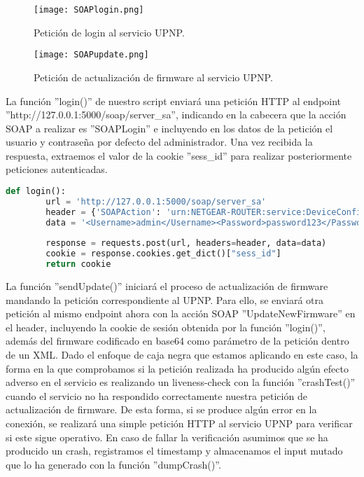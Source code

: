 \begin{figure}[H]
    \centering
    \texttt{[image: SOAPlogin.png]}
    \caption{Petición de login al servicio UPNP.}
    \label{fig:SOAPlogin}
\end{figure}

\begin{figure}[H]
    \centering
    \texttt{[image: SOAPupdate.png]}
    \caption{Petición de actualización de firmware al servicio UPNP.}
    \label{fig:SOAPupdate}
\end{figure}

La función ''login()'' de nuestro script enviará una petición HTTP al endpoint 
''http://127.0.0.1:5000/soap/server\_sa'', indicando en la cabecera que la acción SOAP a realizar es ''SOAPLogin''
e incluyendo en los datos de la petición el usuario y contraseña por defecto del administrador. Una vez 
recibida la respuesta, extraemos el valor de la cookie ''sess\_id'' para realizar posteriormente peticiones
autenticadas.

\begin{lstlisting}[language=python, caption=Función para realizar login en el servicio UPNP., captionpos=b,
    frame=single, breaklines, showstringspaces=false]
    def login():
        url = 'http://127.0.0.1:5000/soap/server_sa'
        header = {'SOAPAction': 'urn:NETGEAR-ROUTER:service:DeviceConfig:1#SOAPLogin'}
        data = '<Username>admin</Username><Password>password123</Password>'
        
        response = requests.post(url, headers=header, data=data)
        cookie = response.cookies.get_dict()["sess_id"]
        return cookie
\end{lstlisting}

La función ''sendUpdate()'' iniciará el proceso de actualización de firmware mandando la petición correspondiente al 
UPNP. Para ello, se enviará otra petición al mismo endpoint ahora con la acción SOAP ''UpdateNewFirmware'' en el header,
incluyendo la cookie de sesión obtenida por la función ''login()'', además del firmware codificado en base64 como parámetro 
de la petición dentro de un XML. Dado el enfoque de caja negra que estamos aplicando en este caso, la forma en la que comprobamos 
si la petición realizada ha producido algún efecto adverso en el servicio es realizando un liveness-check con la función ''crashTest()''
cuando el servicio no ha respondido correctamente nuestra petición de actualización de firmware. De esta forma, si se produce algún error
en la conexión, se realizará una simple petición HTTP al servicio UPNP para verificar si este sigue operativo. En caso de fallar la 
verificación asumimos que se ha producido un crash, registramos el timestamp y almacenamos el input mutado que lo ha generado con la función
''dumpCrash()''.

